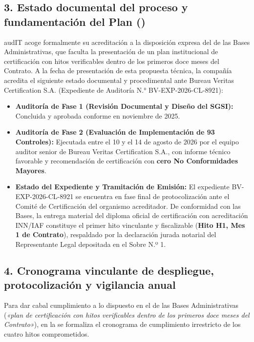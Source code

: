 \subsection*{3. Estado documental del proceso y fundamentación del Plan ()}
audIT acoge formalmente su acreditación a la disposición expresa del  de las Bases Administrativas, que faculta la presentación de un plan institucional de certificación con hitos verificables dentro de los primeros doce meses del Contrato. A la fecha de presentación de esta propuesta técnica, la compañía acredita el siguiente estado documental y procedimental ante Bureau Veritas Certification S.A. (Expediente de Auditoría N.° BV-EXP-2026-CL-8921):
\begin{itemize}
  \item \textbf{Auditoría de Fase 1 (Revisión Documental y Diseño del SGSI):} Concluida y aprobada conforme en noviembre de 2025.
  \item \textbf{Auditoría de Fase 2 (Evaluación de Implementación de 93 Controles):} Ejecutada entre el 10 y el 14 de agosto de 2026 por el equipo auditor senior de Bureau Veritas Certification S.A., con informe técnico favorable y recomendación de certificación con \textbf{cero No Conformidades Mayores}.
  \item \textbf{Estado del Expediente y Tramitación de Emisión:} El expediente BV-EXP-2026-CL-8921 se encuentra en fase final de protocolización ante el Comité de Certificación del organismo acreditador. De conformidad con las Bases, la entrega material del diploma oficial de certificación con acreditación INN/IAF constituye el primer hito vinculante y fiscalizable (\textbf{Hito H1, Mes 1 de Contrato}), respaldado por la declaración jurada notarial del Representante Legal depositada en el Sobre N.º 1.
\end{itemize}

\subsection*{4. Cronograma vinculante de despliegue, protocolización y vigilancia anual}
Para dar cabal cumplimiento a lo dispuesto en el  de las Bases Administrativas (\textit{«plan de certificación con hitos verificables dentro de los primeros doce meses del Contrato»}), en la  se formaliza el cronograma de cumplimiento irrestricto de los cuatro hitos comprometidos.

